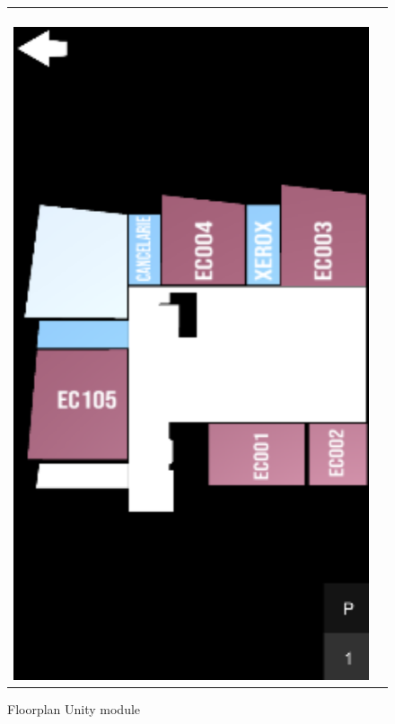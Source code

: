         \begin{figure}
            \begin{tabular}{@{}cc@{}}
                \begin{minipage}[b]{0.35\textwidth} \           \includegraphics[width=\columnwidth]{figures/demos/unity_floorplan.png}
                    \captionsetup{justification=centering}
                    \caption{Floorplan Unity module}   
                    \label{3:fig:unity_floorplan}
                \end{minipage}
            \end{tabular}
        \end{figure}
        

